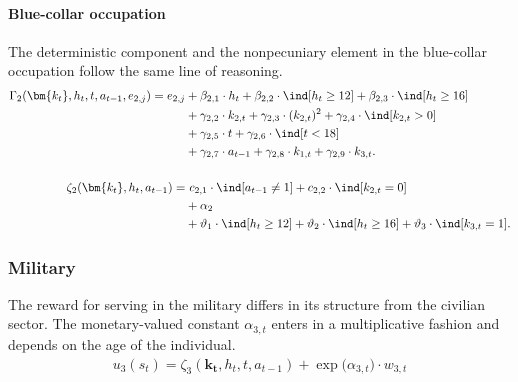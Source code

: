 \paragraph{Blue-collar occupation} The deterministic component and the nonpecuniary element in the blue-collar occupation follow the same line of reasoning.
%
\begin{align*} 
    \Gamma_2(\bm{k_t}, h_t, t, a_{t-1}, e_{2,j}) = e_{2,j} & + \beta_{2,1} \cdot h_t + \beta_{2, 2} \cdot \ind[h_t \geq 12] + \beta_{2,3} \cdot \ind[h_t\geq 16] \\
    							 & + \gamma_{2, 2} \cdot  k_{2,t} + \gamma_{2,3} \cdot  (k_{2,t})^2 + \gamma_{2,4} \cdot  \ind[k_{2,t} > 0] \\
                                   & + \gamma_{2,5} \cdot  t + \gamma_{2,6} \cdot \ind[t < 18] \\
                                  & + \gamma_{2,7} \cdot  a_{t-1} + \gamma_{2,8} \cdot  k_{1,t} + \gamma_{2,9} \cdot  k_{3,t}. \\
                                  &\\
\zeta_{2}( \bm{k_t}, h_t, a_{t-1} ) = &~c_{2,1} \cdot \ind[a_{t-1} \neq 1] + c_{2,2} \cdot \ind[k_{2,t} = 0] \\
                            & + \alpha_2 \\
                            & + \vartheta_1 \cdot \ind[h_t \geq 12] + \vartheta_2 \cdot \ind[h_t \geq 16] + \vartheta_3 \cdot \ind[k_{3,t} = 1].
\end{align*}


\FloatBarrier\subsubsection{Military}
The reward for serving in the military differs in its structure from the civilian sector. The monetary-valued constant $\alpha_{3,t}$ enters in a multiplicative fashion and depends on the age of the individual.
%
\begin{align}\label{eq:RewardMilitary}
    u_{3}(s_t) = \zeta_3(\bm{k_t}, h_t, t , a_{t -1})  + \exp \big( \alpha_{3, t} \big) \cdot w_{3,t}
\end{align}

